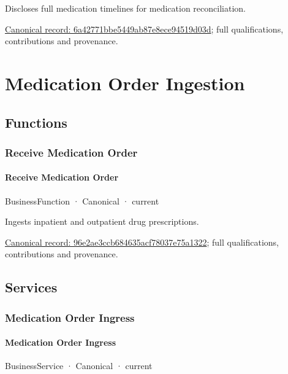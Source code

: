Discloses full medication timelines for medication reconciliation.


{\footnotesize \href{../../../../continuum/business/business-service/6a42771bbe5449ab87e8ece94519d03d.md}{Canonical record: 6a42771bbe5449ab87e8ece94519d03d}; full qualifications, contributions and provenance.}\par
\section{Medication Order Ingestion}

\subsection{Functions}

\subsubsection{Receive Medication Order}

\paragraph{Receive Medication Order}

\label{element:96e2ae3ccb684635acf78037e75a1322}
{\small BusinessFunction · Canonical · current}\par

Ingests inpatient and outpatient drug prescriptions.


{\footnotesize \href{../../../../continuum/business/business-function/96e2ae3ccb684635acf78037e75a1322.md}{Canonical record: 96e2ae3ccb684635acf78037e75a1322}; full qualifications, contributions and provenance.}\par
\subsection{Services}

\subsubsection{Medication Order Ingress}

\paragraph{Medication Order Ingress}

\label{element:3bcfd2c922aa429ba77618ac94982a56}
{\small BusinessService · Canonical · current}\par

